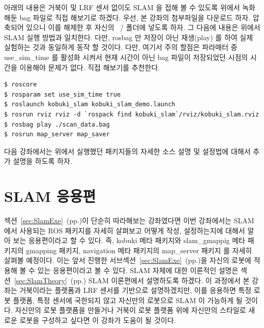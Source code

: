 아래의 내용은 거북이 및 LRF 센서 없이도 SLAM 을 접해 볼 수 있도록 위에서 녹화해둔 bag 파일로 직접 해보기로 하겠다. 우선, 본 강좌의 첨부파일을 다운로드 하자. 압축되어 있으니 이를 해제한 후 자신의 ~/ 폴더에 넣도록 하자. 그 다음에 내용은 위에서 SLAM 실행 방법과 일치한다. 다만, rosbag 만 저장이 아닌 재생(play) 를 하여 실제 실험하는 것과 동일하게 동작 할 것이다. 다만, 여기서 주의 할점은 파라매터 중 use\_sim\_time 를 활성화 시켜서 현재 시간이 아닌 bag 파일이 저장되었던 시점의 시간을 이용해야 문제가 없다. 직접 해보기를 추천한다.

\vspace{\baselineskip}
\begin{lstlisting}[language=ROS]
$ roscore
$ rosparam set use_sim_time true
$ roslaunch kobuki_slam kobuki_slam_demo.launch
$ rosrun rviz rviz -d `rospack find kobuki_slam`/rviz/kobuki_slam.rviz
$ rosbag play ./scan_data.bag
$ rosrun map_server map_saver
\end{lstlisting}

다음 강좌에서는 위에서 실행했던 패키지들의 자세한 소스 설명 및 설정법에 대해서 추가 설명을 하도록 하자.

\newpage
\section{SLAM 응용편}
\label{sec:SlamApp}

섹션~\ref{sec:SlamExe}~(pp.\pageref{sec:SlamExe})이 단순히 따라해보는 강좌였다면 이번 강좌에서는 SLAM 에서 사용되는 ROS 패키지를 자세히 살펴보고 어떻게 작성, 설정하는지에 대해서 알아 보는 응용편이라고 할 수 있다. 즉, kobuki 메타 패키지와 slam\_gmappig 메타 패키지의 gmapping 패키지, navigation 메타 패키지의 map\_server 패키지 를 자세히 살펴볼 예정이다. 이는 앞서 진행한 서브섹션~\ref{sec:SlamExe}~(pp.\pageref{sec:SlamExe})을 자신의 로봇에 적용해 볼 수 있는 응용편이라고 볼 수 있다. SLAM 자체에 대한 이론적인 설명은 섹션~\ref{sec:SlamTheory}~(pp.\pageref{sec:SlamTheory}) SLAM 이론편에서 설명하도록 하겠다.
\label{sec:SlamTheory}
이 과정에서 본 강좌는 거북이라는 플랫폼과 LRF 센서를 기반으로 설명하겠지만, 이를 응용하면 특정 로봇 플랫폼, 특정 센서에 국한되지 않고 자신만의 로봇으로 SLAM 이 가능하게 될 것이다. 자신만의 로봇 플랫폼을 만들거나 거북이 로봇 플랫폼 위에 자신만의 스타일로 새로운 로봇을 구성하고 싶다면 이 강좌가 도움이 될 것이다.

